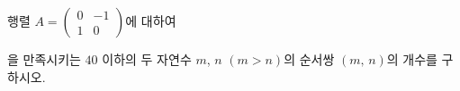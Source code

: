 \hspace*{2mm}\begin{minipage}[t]{\dimexpr\linewidth-2mm\relax}\vspace{0pt}
행렬 $A=\begin{pmatrix} 0 & -1 \\ 1 & 0 \end{pmatrix}$에 대하여 \par\smallskip{}\par\smallskip\noindent 을 만족시키는 $40$ 이하의 두 자연수 $m$, $n$ $(m>n)$의 순서쌍 $(m,\,n)$의 개수를 구하시오.\end{minipage}
